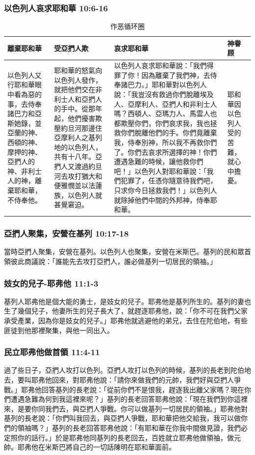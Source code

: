 \subsubsection{以色列人哀求耶和華 10:6-16}
\begin{table}[H]
\centering
\begin{tabular}{p{2.7cm}|p{4.2cm}|p{8.8cm}|p{1.2cm}}\hline\hline
離棄耶和華&受亞捫人欺&哀求耶和華&神眷顾\\\hline
以色列人又行耶和華眼中看為惡的事，去侍奉諸巴力和亞斯她錄，並亞蘭的神、西頓的神、摩押的神、亞捫人的神、非利士人的神，離棄耶和華，不侍奉他。
&耶和華的怒氣向以色列人發作，就把他們交在非利士人和亞捫人的手中。從那年起，他們擾害欺壓約旦河那邊住亞摩利人之基列地的以色列人，共有十八年。亞捫人又渡過約旦河去攻打猶大和便雅憫並以法蓮族，以色列人就甚覺窘迫。
&以色列人哀求耶和華說：「我們得罪了你！因為離棄了我們神，去侍奉諸巴力。」耶和華對以色列人說：「我豈沒有救過你們脫離埃及人、亞摩利人、亞捫人和非利士人嗎？西頓人、亞瑪力人、馬雲人也都欺壓你們，你們哀求我，我也拯救你們脫離他們的手。你們竟離棄我，侍奉別神，所以我不再救你們了。你們去哀求所選擇的神！你們遭遇急難的時候，讓他救你們吧！」以色列人對耶和華說：「我們犯罪了，任憑你隨意待我們吧，只求你今日拯救我們！」以色列人就除掉他們中間的外邦神，侍奉耶和華。
&耶和華因以色列人受的苦難，就心中擔憂。\\\hline
 \end{tabular}
\caption{作恶循环圈}
\end{table}  
 

\subsubsection{亞捫人聚集，安營在基列 10:17-18}
當時亞捫人聚集，安營在基列。以色列人也聚集，安營在米斯巴。基列的民和眾首領彼此商議說：「誰能先去攻打亞捫人，誰必做基列一切居民的領袖。」    

\subsubsection{妓女的兒子-耶弗他 11:1-3}
基列人耶弗他是個大能的勇士，是妓女的兒子。耶弗他是基列所生的。基列的妻也生了幾個兒子，他妻所生的兒子長大了，就趕逐耶弗他，說：「你不可在我們父家承受產業，因為你是妓女的兒子。」耶弗他就逃避他的弟兄，去住在陀伯地，有些匪徒到他那裡聚集，與他一同出入。

\subsubsection{民立耶弗他做首領 11:4-11}
過了些日子，亞捫人攻打以色列。亞捫人攻打以色列的時候，基列的長老到陀伯地去，要叫耶弗他回來，對耶弗他說：「請你來做我們的元帥，我們好與亞捫人爭戰。」耶弗他回答基列的長老說：「從前你們不是恨我，趕逐我出離父家嗎？現在你們遭遇急難為何到我這裡來呢？」基列的長老回答耶弗他說：「現在我們到你這裡來，是要你同我們去，與亞捫人爭戰。你可以做基列一切居民的領袖。」耶弗他對基列的長老說：「你們叫我回去，與亞捫人爭戰，耶和華把他交給我，我可以做你們的領袖嗎？」基列的長老回答耶弗他說：「有耶和華在你我中間做見證，我們必定照你的話行。」於是耶弗他同基列的長老回去，百姓就立耶弗他做領袖，做元帥。耶弗他在米斯巴將自己的一切話陳明在耶和華面前。

